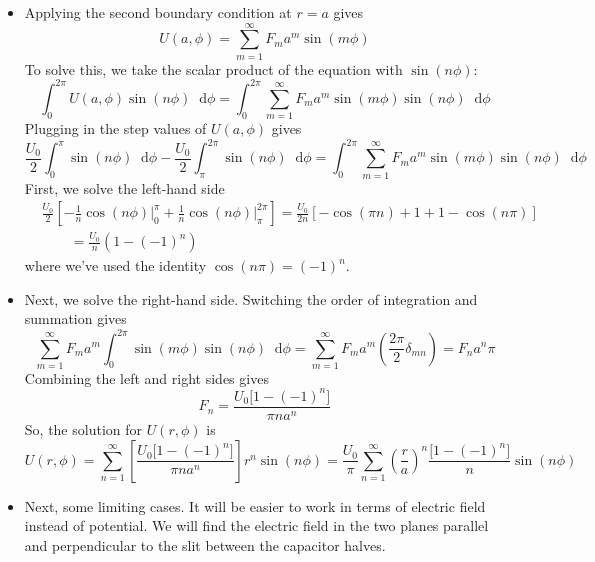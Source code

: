 \documentclass[11pt, a4paper]{article}
\newcommand{\diff}{\mathop{}\!\mathrm{d}} %
\begin{document}
\begin{itemize}
	\item Applying the second boundary condition at $ r = a $ gives
	\begin{equation*}
		U(a, \phi) = \sum_{m=1}^{\infty} F_{m}a^{m} \sin (m\phi)
	\end{equation*} 
	To solve this, we take the scalar product of the equation with $ \sin(n \phi) $: 
	\begin{equation*}
		\int_{0}^{2\pi} U(a, \phi)\sin(n \phi) \diff \phi =  \int_{0}^{2\pi} \sum_{m=1}^{\infty} F_{m}a^{m} \sin (m\phi) \sin(n \phi) \diff \phi
	\end{equation*}
	Plugging in the step values of $ U(a, \phi) $ gives
	\begin{equation*}
		\frac{U_{0}}{2}\int_{0}^{\pi}\sin(n \phi) \diff \phi - \frac{U_{0}}{2}\int_{\pi}^{2\pi}\sin(n \phi) \diff \phi  =  \int_{0}^{2\pi} \sum_{m=1}^{\infty} F_{m}a^{m} \sin (m\phi) \sin(n \phi) \diff \phi
	\end{equation*}
	First, we solve the left-hand side
	\begin{align*}
		&\frac{U_{0}}{2}\left[-\frac{1}{n}\cos(n\phi)\big |_{0}^{\pi} + \frac{1}{n}\cos (n\phi)\big |_{\pi}^{2\pi} \right] = \frac{U_{0}}{2n}\left[-\cos(\pi n) + 1 + 1 - \cos(n\pi)\right]\\
		&{}\qquad = \frac{U_{0}}{n}\left(1 - (-1)^{n}\right)
	\end{align*}
	where we've used the identity $ \cos(n\pi) = (-1)^{n} $.
	
	\item Next, we solve the right-hand side. Switching the order of integration and summation gives
	\begin{equation*}
		  \sum_{m=1}^{\infty} F_{m}a^{m} \int_{0}^{2\pi}  \sin (m\phi) \sin(n \phi) \diff \phi = \sum_{m=1}^{\infty} F_{m}a^{m}\left (\frac{2\pi}{2}\delta_{mn} \right ) = F_{n}a^{n} \pi
	\end{equation*}
	Combining the left and right sides gives
	\begin{equation*}
		F_{n} = \frac{U_{0}\big[1 - (-1)^{n}\big]}{\pi n a^{n}}
	\end{equation*}
	So, the solution for $ U(r, \phi) $ is
	\begin{equation*}
		U(r, \phi) = \sum_{n = 1}^{\infty} \left[\frac{U_{0}\big[1 - (-1)^{n}\big]}{\pi n a^{n}}\right]r^{n}\sin(n\phi) = \frac{U_{0}}{\pi} \sum_{n = 1}^{\infty} \left(\frac{r}{a}\right)^{n} \frac{\big[1 - (-1)^{n}\big]}{n}\sin(n\phi)
	\end{equation*}
	
	\item Next, some limiting cases. It will be easier to work in terms of electric field instead of potential. We will find the electric field in the two planes parallel and perpendicular to the slit between the capacitor halves. 
	

\end{itemize}
\end{document}
